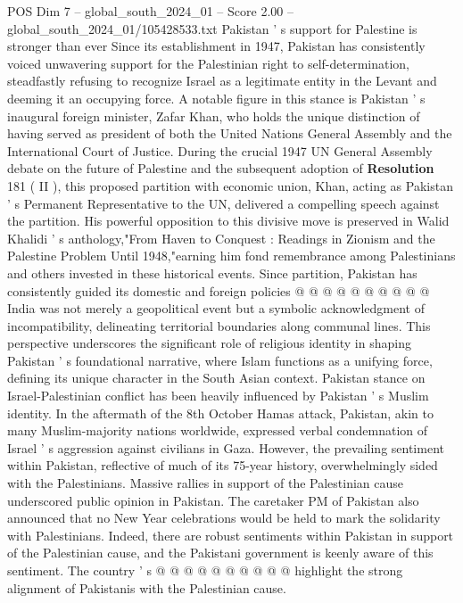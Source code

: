 \begin{textsample}{POS Dim 7 – global\_south\_2024\_01 – Score 2.00 – global\_south\_2024\_01/105428533.txt}  \label{ex:f7_pos_046}
Pakistan ' s support for Palestine is stronger than ever Since its establishment in 1947, Pakistan has consistently voiced unwavering support for the Palestinian right to self-determination, steadfastly refusing to recognize Israel as a legitimate entity in the Levant and deeming it an occupying force.
A notable figure in this stance is Pakistan ' s inaugural foreign minister, Zafar Khan, who holds the unique distinction of having served as president of both the United Nations General Assembly and the International Court of Justice.
During the crucial 1947 UN General Assembly debate on the future of Palestine and the subsequent adoption of \textbf{Resolution} 181 ( II ), this proposed partition with economic union, Khan, acting as Pakistan ' s Permanent Representative to the UN, delivered a compelling speech against the partition.
His powerful opposition to this divisive move is preserved in Walid Khalidi ' s anthology,"From Haven to Conquest : Readings in Zionism and the Palestine Problem Until 1948,"earning him fond remembrance among Palestinians and others invested in these historical events.
Since partition, Pakistan has consistently guided its domestic and foreign policies @ @ @ @ @ @ @ @ @ @ India was not merely a geopolitical event but a symbolic acknowledgment of incompatibility, delineating territorial boundaries along communal lines.
This perspective underscores the significant role of religious identity in shaping Pakistan ' s foundational narrative, where Islam functions as a unifying force, defining its unique character in the South Asian context.
Pakistan stance on Israel-Palestinian conflict has been heavily influenced by Pakistan ' s Muslim identity.
In the aftermath of the 8th October Hamas attack, Pakistan, akin to many Muslim-majority nations worldwide, expressed verbal condemnation of Israel ' s aggression against civilians in Gaza.
However, the prevailing sentiment within Pakistan, reflective of much of its 75-year history, overwhelmingly sided with the Palestinians.
Massive rallies in support of the Palestinian cause underscored public opinion in Pakistan.
The caretaker PM of Pakistan also announced that no New Year celebrations would be held to mark the solidarity with Palestinians.
Indeed, there are robust sentiments within Pakistan in support of the Palestinian cause, and the Pakistani government is keenly aware of this sentiment.
The country ' s @ @ @ @ @ @ @ @ @ @ highlight the strong alignment of Pakistanis with the Palestinian cause.

\end{textsample}
